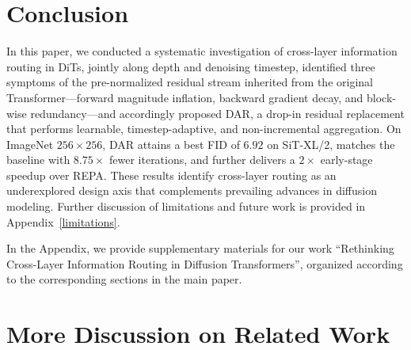 \documentclass[]{ant_tech_report}
\begin{document}
\section{Conclusion}  \label{sec:conclusions}
In this paper, we conducted a systematic investigation of cross-layer information routing in DiTs, jointly along depth and denoising timestep, identified three symptoms of the pre-normalized residual stream inherited from the original Transformer---forward magnitude inflation, backward gradient decay, and block-wise redundancy---and accordingly proposed \textsc{DAR}, a drop-in residual replacement that performs learnable, timestep-adaptive, and non-incremental aggregation. On ImageNet $256{\times}256$, \textsc{DAR} attains a best FID of $6.92$ on SiT-XL/2, matches the baseline with $8.75\times$ fewer iterations, and further delivers a $2\times$ early-stage speedup over REPA. These results identify cross-layer routing as an underexplored design axis that complements prevailing advances in diffusion modeling. Further discussion of limitations and future work is provided in Appendix~\ref{limitations}.









\newpage
\appendix
\noindent In the Appendix, we provide supplementary materials for our work ``Rethinking Cross-Layer Information Routing in
Diffusion Transformers'', organized according to the corresponding sections in the main paper.


\section{More Discussion on Related Work}
\label{app:relatedworks}
\end{document}

